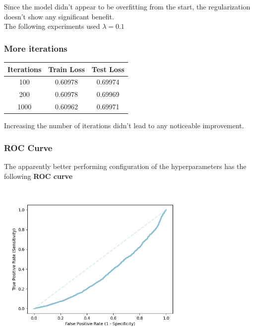 \documentclass[
	letterpaper, %
	10pt, %
]{class}
\begin{document}
Since the model didn't appear to be overfitting from the start, the regularization doesn't show any significant benefit.\\
The following experiments used $\lambda = 0.1$

\subsubsection{More iterations}

\begin{center}
    \begin{tabular}{ |c|c|c| }
        \hline
        Iterations & Train Loss & Test Loss \\
        \hline
        100        & 0.60978    & 0.69974   \\
        200        & 0.60978    & 0.69969   \\
        1000       & 0.60962    & 0.69971   \\
        \hline
    \end{tabular}
\end{center}

Increasing the number of iterations didn't lead to any noticeable improvement.

\subsubsection{ROC Curve}

The apparently better performing configuration of the hyperparameters has the following \textbf{ROC curve}

\begin{center}
    \includegraphics[width=10cm]{../images/roc_1.png}
\end{center}
\end{document}
